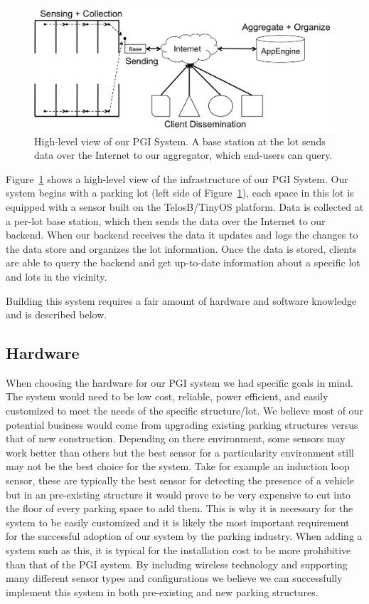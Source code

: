 \documentclass{acm_proc}
\begin{document}
\begin{figure}
    \begin{center}
		\includegraphics[width=\columnwidth]{figures/high-level}
	\end{center}
	\caption{High-level view of our PGI System. A base station at the lot
	sends data over the Internet to our aggregator, which end-users can
	query.}
	\label{fig:high-level}
\end{figure}

Figure~\ref{fig:high-level} shows a high-level view of the infrastructure
of our PGI System.
Our system begins with a parking lot (left side of
Figure~\ref{fig:high-level}), each space in this lot is equipped with a
sensor built on the TelosB/TinyOS platform.
Data is collected at a per-lot base station, which then sends the data over
the Internet to our backend.
When our backend receives the data it updates and logs the changes to the
data store and organizes the lot information.
Once the data is stored, clients are able to query the backend and get
up-to-date information about a specific lot and lots in the vicinity.

Building this system requires a fair amount of hardware and software
knowledge and is described below.

\subsection{Hardware}
When choosing the hardware for our PGI system we had specific goals in mind.  The system would need to be low cost, reliable, power efficient, and easily customized to meet the needs of the specific structure/lot.  We believe most of our potential business would come from upgrading existing parking structures versus that of new construction.  Depending on there environment, some sensors may work better than others but the best sensor for a particularity environment still may not be the best choice for the system.  Take for example an induction loop sensor, these are typically the best sensor for detecting the presence of a vehicle but in an pre-existing structure it would prove to be very expensive to cut into the floor of every parking space to add them.  This is why it is necessary for the system to be easily customized and it is likely the most important requirement for the successful adoption of our system by the parking industry.  When adding a system such as this, it is typical for the installation cost to be more prohibitive than that of the PGI system.  By including wireless technology and supporting many different sensor types and configurations we believe we can successfully implement this system in both pre-existing and new parking structures.
\end{document}
